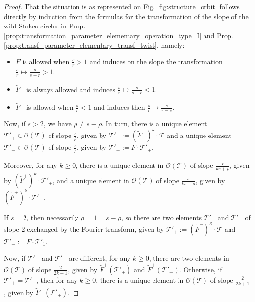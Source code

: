 \documentclass[10pt,a4paper]{amsart}
\begin{document}
\begin{proof}
That the situation is as represented on Fig. \ref{fig:structure_orbit} follows directly by induction from the formulas for the transformation of the slope of the wild Stokes circles in Prop. \ref{prop:transformation_parameter_elementary_operation_type_I} and Prop. \ref{prop:transf_parameter_elementary_transf_twist}, namely: 
\begin{itemize}
\item $F$ is allowed when $\frac{s}{r}>1$ and induces on the slope the transformation $\frac{s}{r}\mapsto \frac{s}{s-r}>1$.
\item $\widetilde{F}^{+}$ is always allowed and induces $\frac{s}{r}\mapsto \frac{s}{s+r}<1$.
\item $\widetilde{F}^{-}$ is allowed when $\frac{s}{r}<1$ and induces then $\frac{s}{r}\mapsto \frac{s}{r-s}$.
\end{itemize}
 
Now, if $s>2$, we have $\rho\neq s-\rho$. In turn, there is a unique element $\mathcal T'_+\in \mathcal O(\mathcal T)$ of slope $\frac{s}{\rho}$, given by  $\mathcal T'_+:=(\widetilde F^{-})^\kappa \cdot \mathcal T$ and a unique element $\mathcal T'_-\in \mathcal O(\mathcal T)$ of slope $\frac{s}{\rho}$, given  by $\mathcal T'_-:=F\cdot \mathcal T'_+$.

Moreover, for any $k\geq 0$, there is a unique element in $\mathcal O(\mathcal T)$ of slope $\frac{s}{ks+\rho}$, given by $(\widetilde F^+)^k\cdot \mathcal T'_+$, and a unique element in $\mathcal O(\mathcal T)$ of slope $\frac{s}{ks-\rho}$, given by $(\widetilde F^+)^k\cdot \mathcal T'_-$. 


If $s=2$, then necessarily $\rho=1=s-\rho$, so there are two elements $\mathcal T'_+$ and $\mathcal T'_-$ of slope $2$ exchanged by the Fourier transform, given by $\mathcal T'_+:=(\widetilde F^{-})^\kappa \cdot \mathcal T$ and $\mathcal T'_-:=F\cdot \mathcal T'_1$. 

Now, if $\mathcal T'_+$ and $\mathcal T'_-$ are different, for any $k\geq 0$, there are two elements in $\mathcal O(\mathcal T)$ of slope $\frac{2}{2k+1}$, given by $\widetilde F^+(\mathcal T'_+)$ and $\widetilde F^+(\mathcal T'_-)$. Otherwise, if $\mathcal T'_+=\mathcal T'_-$, then for any $k\geq 0$, there is a unique element in $\mathcal O(\mathcal T)$ of slope $\frac{2}{2k+1}$, given by $\widetilde F^+(\mathcal T'_+)$.
\end{proof}
\end{document}
